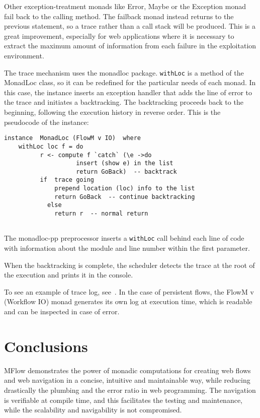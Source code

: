 \documentclass{tmr}
\begin{document}
Other exception-treatment monads like Error, Maybe or the Exception monad  fail back to the calling method. The failback monad instead returns to the previous statement, so  a trace rather than a call stack will be produced. This is a great improvement, especially for web applications where it is necessary to extract the maximum amount of information from each failure in the exploitation environment. 

The trace mechanism uses the monadloc\cite{auth:monadloc} package. {\tt withLoc} is a method of the MonadLoc class, so it can be redefined for the particular needs of each monad. In this case, the instance inserts an exception handler that adds the line of error to the trace and initiates a backtracking. The backtracking proceeds back to the beginning, following the execution history in reverse order.  This is the pseudocode of the instance: 
 
{\tt

\begin{verbatim}
instance  MonadLoc (FlowM v IO)  where 
    withLoc loc f = do 
          r <- compute f `catch` (\e ->do 
                    insert (show e) in the list 
                    return GoBack)  -- backtrack 
          if  trace going 
              prepend location (loc) info to the list 
              return GoBack  -- continue backtracking 
            else 
              return r  -- normal return 
 
 \end{verbatim}
 
 }
 
The monadloc-pp preprocessor inserts a {\tt withLoc} call behind each line of code with information about the module and line number within the first parameter. 

When the backtracking is complete, the scheduler detects the trace at the root of the execution and prints it in the console.
 
To see an example of trace log, see~\cite{auth:trace}. In the case of persistent flows, the FlowM v (Workflow IO) monad generates its own log at execution time, which is readable and can be inspected in case of error. 
 
\section{Conclusions} 
 
MFlow demonstrates the power of monadic computations for creating web flows and web navigation in a concise, intuitive and maintainable way, while reducing drastically the plumbing and the error ratio in web programming.  The navigation is verifiable at compile time, and this facilitates the testing and maintenance, while the scalability and navigability is not compromised.  
  
\end{document}
